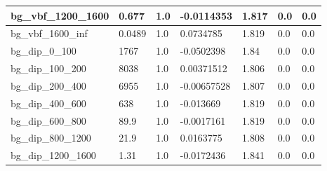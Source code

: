 \documentclass[a4paper, 10pt]{article}
\begin{document}
\begin{table}[H]
\begin{center}
\begin{tabular}{|m{23.0mm}|m{23.0mm}|m{18.0mm}|m{19.0mm}|m{19.0mm}|m{19.0mm}|m{19.0mm}|}
      \hline
      {\cellcolor{white}         bg\_vbf\_1200\_1600}& {\cellcolor{white}         0.677}& {\cellcolor{white}         1.0}& {\cellcolor{white}         -0.0114353}& {\cellcolor{white}         1.817}& {\cellcolor{green}         0.0}& {\cellcolor{green}         0.0}\\
      \hline
      {\cellcolor{white}         bg\_vbf\_1600\_inf}& {\cellcolor{white}         0.0489}& {\cellcolor{white}         1.0}& {\cellcolor{white}         0.0734785}& {\cellcolor{white}         1.819}& {\cellcolor{green}         0.0}& {\cellcolor{green}         0.0}\\
      \hline
      {\cellcolor{white}         bg\_dip\_0\_100}& {\cellcolor{white}         1767}& {\cellcolor{white}         1.0}& {\cellcolor{white}         -0.0502398}& {\cellcolor{white}         1.84}& {\cellcolor{green}         0.0}& {\cellcolor{green}         0.0}\\
      \hline
      {\cellcolor{white}         bg\_dip\_100\_200}& {\cellcolor{white}         8038}& {\cellcolor{white}         1.0}& {\cellcolor{white}         0.00371512}& {\cellcolor{white}         1.806}& {\cellcolor{green}         0.0}& {\cellcolor{green}         0.0}\\
      \hline
      {\cellcolor{white}         bg\_dip\_200\_400}& {\cellcolor{white}         6955}& {\cellcolor{white}         1.0}& {\cellcolor{white}         -0.00657528}& {\cellcolor{white}         1.807}& {\cellcolor{green}         0.0}& {\cellcolor{green}         0.0}\\
      \hline
      {\cellcolor{white}         bg\_dip\_400\_600}& {\cellcolor{white}         638}& {\cellcolor{white}         1.0}& {\cellcolor{white}         -0.013669}& {\cellcolor{white}         1.819}& {\cellcolor{green}         0.0}& {\cellcolor{green}         0.0}\\
      \hline
      {\cellcolor{white}         bg\_dip\_600\_800}& {\cellcolor{white}         89.9}& {\cellcolor{white}         1.0}& {\cellcolor{white}         -0.0017161}& {\cellcolor{white}         1.819}& {\cellcolor{green}         0.0}& {\cellcolor{green}         0.0}\\
      \hline
      {\cellcolor{white}         bg\_dip\_800\_1200}& {\cellcolor{white}         21.9}& {\cellcolor{white}         1.0}& {\cellcolor{white}         0.0163775}& {\cellcolor{white}         1.808}& {\cellcolor{green}         0.0}& {\cellcolor{green}         0.0}\\
      \hline
      {\cellcolor{white}         bg\_dip\_1200\_1600}& {\cellcolor{white}         1.31}& {\cellcolor{white}         1.0}& {\cellcolor{white}         -0.0172436}& {\cellcolor{white}         1.841}& {\cellcolor{green}         0.0}& {\cellcolor{green}         0.0}\\

\end{tabular}
\end{center}
\end{table}
\end{document}
